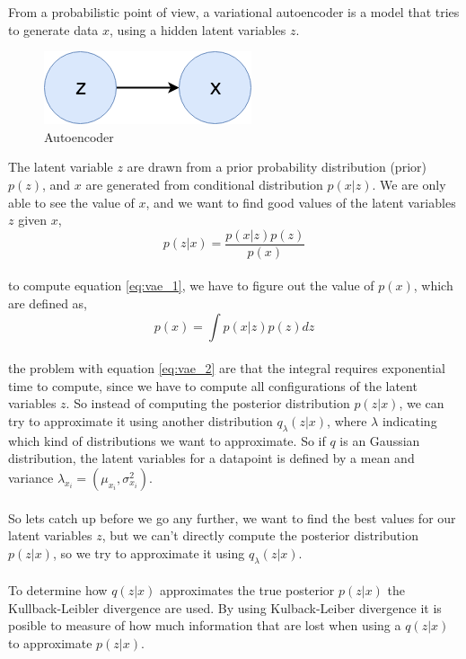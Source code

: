 \documentclass[11pt]{article}
\begin{document}
From a probabilistic point of view, a variational autoencoder is a model that tries to generate data $x$, using a hidden latent variables $z$. 
\begin{figure}[!h]
    \centering
    \includegraphics[scale=0.45]{figurer/vae/vae_1.png}
    \caption{Autoencoder}
    \label{fig:vae_math1}
\end{figure}
The latent variable $z$ are drawn from a prior probability distribution (prior) $p(z)$, and $x$ are generated from conditional distribution $p(x | z)$. We are only able to see the value of $x$, and we want to find good values of the latent variables $z$ given $x$,
\\
\begin{equation}\label{eq:vae_1}
    p(z | x) = \frac{p(x | z) p(z)}{p(x)}
\end{equation}
\\
to compute equation \ref{eq:vae_1}, we have to figure out the value of $p(x)$, which are defined as,
\\
\begin{equation}\label{eq:vae_2}
    p(x) = \int p(x | z) p(z) dz
\end{equation}
\\
the problem with equation \ref{eq:vae_2} are that the integral requires exponential time to compute, since we have to compute all configurations of the latent variables $z$. So instead of computing the posterior distribution $p(z | x)$, we can try to approximate it using another distribution $q_{\lambda} (z | x)$, where $\lambda$ indicating which kind of distributions we want to approximate. So if $q$ is an Gaussian distribution, the latent variables for a datapoint is defined by a mean and variance $\lambda_{x_i} = (\mu_{x_i}, \sigma^{2}_{x_i})$.
\\ \\
So lets catch up before we go any further, we want to find the best values for our latent variables $z$, but we can't directly compute the posterior distribution $p(z | x)$, so we try to approximate it using $q_{\lambda}(z | x)$.
\\ \\
To determine how $q(z | x)$ approximates the true posterior $p(z | x)$ the Kullback-Leibler divergence are used. By using Kulback-Leiber divergence it is posible to measure of how much information that are lost when using a $q(z | x)$ to approximate $p(z | x)$.
\end{document}
